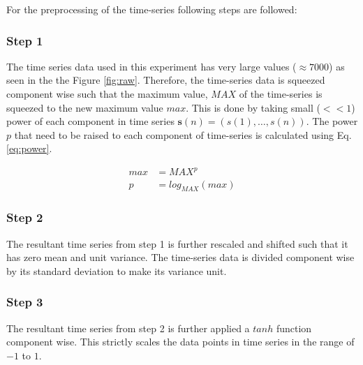 For the preprocessing of the time-series following steps are followed:
\subsubsection{Step 1}
The time series data used in this experiment has very large values ($\approx  7000$) as seen in the the Figure \ref{fig:raw}.  Therefore, the time-series data is squeezed component wise such that the maximum value, $MAX$ of the time-series is squeezed to the new maximum value $max$. This is done by taking small ($< < 1$) power of each component in time series $\mathbf{s}(n) = (s(1),\hdots,s(n))$. The power $p$ that need to be raised to each component of time-series is calculated using Eq. \ref{eq:power}.  

\begin{equation}
\begin{split}
		max &= MAX^p\\
		p &= log_{MAX}(max)
\end{split}
\label{eq:power}
\end{equation}

\subsubsection{Step 2}
   The resultant time series from step 1 is further rescaled and shifted such that it has zero mean and unit variance. The time-series data is divided component wise by its standard deviation to make its variance unit. 
   
\subsubsection{Step 3}
  The resultant time series from step 2 is further applied a $tanh$ function component wise. This strictly scales the data points in time series in the range of $-1$ to $1$.
  
